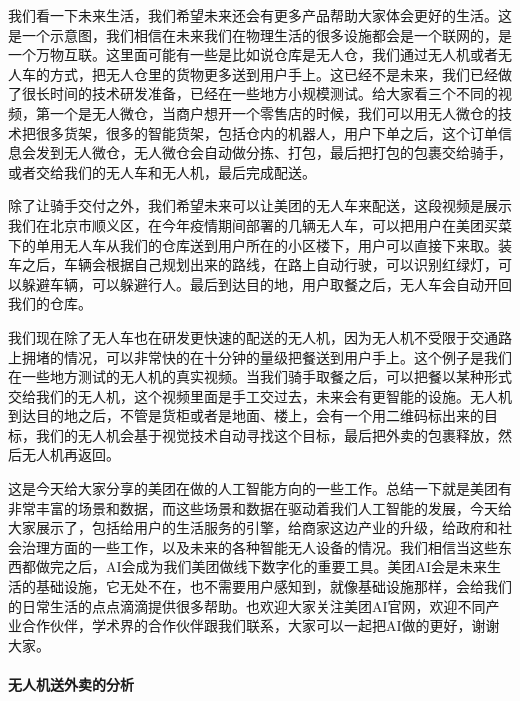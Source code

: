 \documentclass[letterpaper,11pt,english]{sphinxmanual}
\begin{document}
我们看一下未来生活，我们希望未来还会有更多产品帮助大家体会更好的生活。这是一个示意图，我们相信在未来我们在物理生活的很多设施都会是一个联网的，是一个万物互联。这里面可能有一些是比如说仓库是无人仓，我们通过无人机或者无人车的方式，把无人仓里的货物更多送到用户手上。这已经不是未来，我们已经做了很长时间的技术研发准备，已经在一些地方小规模测试。给大家看三个不同的视频，第一个是无人微仓，当商户想开一个零售店的时候，我们可以用无人微仓的技术把很多货架，很多的智能货架，包括仓内的机器人，用户下单之后，这个订单信息会发到无人微仓，无人微仓会自动做分拣、打包，最后把打包的包裹交给骑手，或者交给我们的无人车和无人机，最后完成配送。

除了让骑手交付之外，我们希望未来可以让美团的无人车来配送，这段视频是展示我们在北京市顺义区，在今年疫情期间部署的几辆无人车，可以把用户在美团买菜下的单用无人车从我们的仓库送到用户所在的小区楼下，用户可以直接下来取。装车之后，车辆会根据自己规划出来的路线，在路上自动行驶，可以识别红绿灯，可以躲避车辆，可以躲避行人。最后到达目的地，用户取餐之后，无人车会自动开回我们的仓库。

我们现在除了无人车也在研发更快速的配送的无人机，因为无人机不受限于交通路上拥堵的情况，可以非常快的在十分钟的量级把餐送到用户手上。这个例子是我们在一些地方测试的无人机的真实视频。当我们骑手取餐之后，可以把餐以某种形式交给我们的无人机，这个视频里面是手工交过去，未来会有更智能的设施。无人机到达目的地之后，不管是货柜或者是地面、楼上，会有一个用二维码标出来的目标，我们的无人机会基于视觉技术自动寻找这个目标，最后把外卖的包裹释放，然后无人机再返回。

这是今天给大家分享的美团在做的人工智能方向的一些工作。总结一下就是美团有非常丰富的场景和数据，而这些场景和数据在驱动着我们人工智能的发展，今天给大家展示了，包括给用户的生活服务的引擎，给商家这边产业的升级，给政府和社会治理方面的一些工作，以及未来的各种智能无人设备的情况。我们相信当这些东西都做完之后，AI会成为我们美团做线下数字化的重要工具。美团AI会是未来生活的基础设施，它无处不在，也不需要用户感知到，就像基础设施那样，会给我们的日常生活的点点滴滴提供很多帮助。也欢迎大家关注美团AI官网，欢迎不同产业合作伙伴，学术界的合作伙伴跟我们联系，大家可以一起把AI做的更好，谢谢大家。


\paragraph{无人机送外卖的分析}
\label{\detokenize{chapter_company/meituan:id7}}
%
\begin{footnote}[910]\sphinxAtStartFootnote
{}
%
\end{footnote}
\end{document}
